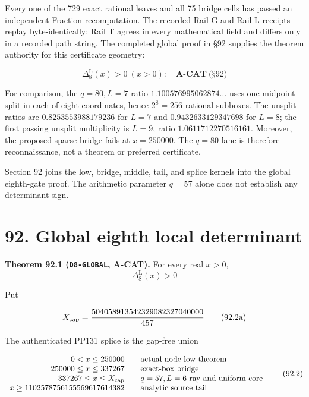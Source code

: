 \documentclass[
  11pt,
]{book}
\renewenvironment{quote}
  {\begin{tcolorbox}[
      enhanced,
      breakable,
      colback=tncream,
      colframe=tnrust,
      boxrule=0.8pt,
      arc=1.5pt,
      left=7pt,
      right=7pt,
      top=6pt,
      bottom=6pt]}
  {\end{tcolorbox}}
\begin{document}
Every one of the 729 exact rational leaves and all 75 bridge cells has
passed an independent Fraction recomputation. The recorded Rail G and
Rail L receipts replay byte-identically; Rail T agrees in every
mathematical field and differs only in a recorded path string. The
completed global proof in §92 supplies the theorem authority for this
certificate geometry:

\[
\boxed{\Delta_8^{\mathrm L}(x)>0\ (x>0):\quad\textbf{A-CAT}\ \text{(§92)}}
\tag{87.3}
\]

For comparison, the \(q=80,L=7\) ratio \(1.100576995062874\ldots\) uses
one midpoint split in each of eight coordinates, hence \(2^8=256\)
rational subboxes. The unsplit ratios are \(0.8253553988179236\) for
\(L=7\) and \(0.9432633129347698\) for \(L=8\); the first passing
unsplit multiplicity is \(L=9\), ratio \(1.0611712270516161\). Moreover,
the proposed sparse bridge fails at \(x=250000\). The \(q=80\) lane is
therefore reconnaissance, not a theorem or preferred certificate.

Section 92 joins the low, bridge, middle, tail, and splice kernels into
the global eighth-gate proof. The arithmetic parameter \(q=57\) alone
does not establish any determinant sign.

\section{92. Global eighth local
determinant}\label{global-eighth-local-determinant}

\begin{quote}
\textbf{Theorem 92.1 (\texttt{D8-GLOBAL}, A-CAT).} For every real
\(x>0\), \[
\boxed{\Delta_8^{\mathrm L}(x)>0}
\tag{92.1}
\]
\end{quote}

Put

\[
X_{\rm cap}=\frac{504058913542329082327040000}{457}
\tag{92.2a}
\]

The authenticated PP131 splice is the gap-free union

\[
\begin{array}{rcl}
0<x\le250000 && \text{actual-node low theorem}\\
250000\le x\le337267 && \text{exact-box bridge}\\
337267\le x\le X_{\rm cap}
&& \text{$q=57,L=6$ ray and uniform core}\\
x\ge1102578756155569617614382 && \text{analytic source tail}
\end{array}
\tag{92.2}
\]
\end{document}
